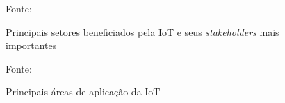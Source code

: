 \documentclass[pdftex, brazil, 12pt, twoside]{article}
\newcommand{\ingles}[1]{\textit{#1}}
\begin{document}
\begin{figure}[!h]
  \begin{center}
    \caption{Principais setores beneficiados pela IoT
      e seus \ingles{stakeholders} mais importantes}
    \label{fig:aplicacoes-iot-2}
    
    \footnotesize{Fonte:~\citet[][p.\ 12]{IEEEIoTDefinition}}
  \end{center}
\end{figure}

\begin{figure}[!h]
  \begin{center}
    \caption{Principais áreas de aplicação da IoT}
    \label{fig:aplicacoes-iot-3}
    
    \footnotesize{Fonte:~\citet[][p.\ 5]{McKinseyIoTHype}}
  \end{center}
\end{figure}
\end{document}
